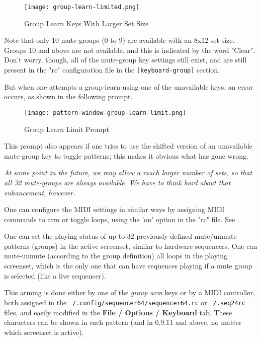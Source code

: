 \begin{figure}[H]
   \centering 
   \texttt{[image: group-learn-limited.png]}
   \caption{Group Learn Keys With Larger Set Size}
   \label{fig:pattern_window_group_learn_limited}
\end{figure}

   Note that only 10 mute-groups (0 to 9) are available with an 8x12 set size.
   Groups 10 and above are not available, and this is indicated by the word
   "Clear".  Don't worry, though, all of the mute-group key settings still
   exist, and are still present in the "rc" configuration file in the
   \texttt{[keyboard-group]} section.

   But when one attempts a group-learn using one of the unavailable keys,
   an error occurs, as shown in the following prompt.

\begin{figure}[H]
   \centering 
   \texttt{[image: pattern-window-group-learn-limit.png]}
   \caption{Group Learn Limit Prompt}
   \label{fig:pattern_window_group_learn_limit}
\end{figure}

   This prompt also appears if one tries to use the shifted version of an
   unavailable mute-group key to toggle patterns; this makes it obvious what
   has gone wrong.

   \textsl{
   At some point in the future, we may allow a much larger number of sets, so
   that all 32 mute-groups are always available.  We have to think hard about
   that enhancement, however.
   }

   One can configure the MIDI settings in similar ways
   by assigning MIDI commands to arm or toggle loops, using 
   the 'on' option in the "rc" file.
   See .

   One can set the playing status of up to 32 previously
   defined mute/unmute patterns (groups) in the active screenset, similar to
   hardware sequencers.  One can mute-unmute (according to the group
   definition) all loops in the playing screenset, which is the only one that
   can have sequences playing if a mute group is selected
   (like a live sequencer).

   This arming is done either by one of the \textsl{group arm} keys
   or by a MIDI controller, both assigned in the
   \texttt{~/.config/sequencer64/sequencer64.rc} or \texttt{~/.seq24rc} files,
   and easily modified in the \textbf{File / Options / Keyboard} tab.
   These characters can be shown in each pattern (and in 0.9.11 and above, no
   matter which screenset is active).

